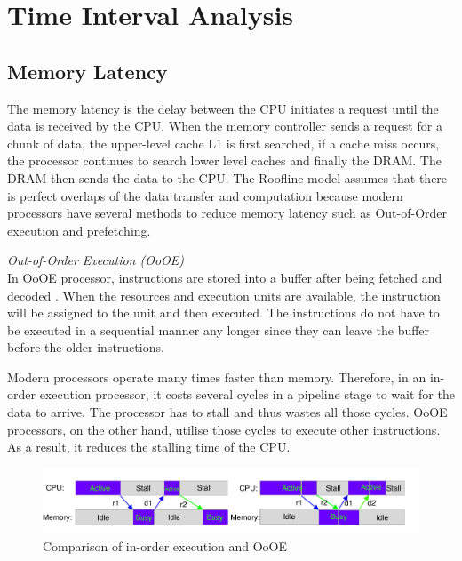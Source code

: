 \section{Time Interval Analysis}

\subsection{Memory Latency}
The memory latency is the delay between the CPU initiates a request until the data is received by the CPU. When the memory controller sends a request for a chunk of data, the upper-level cache L1 is first searched, if a cache miss occurs,  the processor continues to search lower level caches and finally the DRAM. The DRAM then sends the data to the CPU. The Roofline model assumes that there is perfect overlaps of the data transfer and computation because modern processors have several methods to reduce memory latency such as Out-of-Order execution and prefetching. 


\textit{Out-of-Order Execution (OoOE)}\\
In OoOE processor, instructions are stored into a buffer after being fetched and decoded \cite{13}. When the resources and execution units are available, the instruction will be assigned to the unit and then executed. The instructions do not have to be executed in a sequential manner any longer since they can leave the buffer before the older instructions. 

Modern processors operate many times faster than memory. Therefore, in an in-order execution processor, it costs several cycles in a pipeline stage to wait for the data to arrive. The processor has to stall and thus wastes all those cycles. OoOE processors, on the other hand, utilise those cycles to execute other instructions. As a result, it reduces the stalling time of the CPU. 

\begin{figure} [h] %
	\centering   %
	\includegraphics[width=15cm]{pictures/fig3.6}
	\caption{Comparison of in-order execution and OoOE}
	\label{fig3.5}  %
\end{figure}

